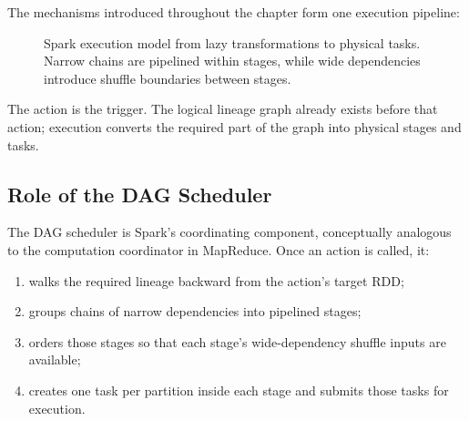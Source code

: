 \documentclass[11pt,a4paper,oneside]{book}
\begin{document}
The mechanisms introduced throughout the chapter form one execution pipeline:

\begin{figure}[htbp]
\centering
{}
\caption{Spark execution model from lazy transformations to physical tasks. Narrow chains are pipelined within stages, while wide dependencies introduce shuffle boundaries between stages.}
\label{fig:spark-full-execution}
\end{figure}

The action is the trigger. The logical lineage graph already exists before that action; execution converts the required part of the graph into physical stages and tasks.

\subsection{Role of the DAG Scheduler}

The DAG scheduler is Spark's coordinating component, conceptually analogous to the computation coordinator in MapReduce. Once an action is called, it:

\begin{enumerate}
    \item walks the required lineage backward from the action's target RDD;
    \item groups chains of narrow dependencies into pipelined stages;
    \item orders those stages so that each stage's wide-dependency shuffle inputs are available;
    \item creates one task per partition inside each stage and submits those tasks for execution.
\end{enumerate}
\end{document}
